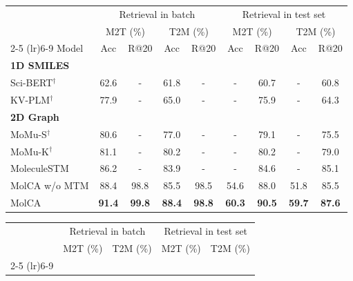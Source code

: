 \documentclass[11pt]{article}
\begin{document}
\begin{table*}[t!]
\begin{subtable}[t]{\textwidth}
   \centering
   \small
   \begin{tabular}{lcccccccc}\toprule
    & \multicolumn{4}{c}{Retrieval in batch} & \multicolumn{4}{c}{Retrieval in test set} \\
    & \multicolumn{2}{c}{M2T (\%)} & \multicolumn{2}{c}{T2M (\%)} & \multicolumn{2}{c}{M2T (\%)} & \multicolumn{2}{c}{T2M (\%)} \\\cmidrule(lr){2-5} \cmidrule(lr){6-9}
   Model & Acc & \multicolumn{1}{c}{R@20} & Acc & \multicolumn{1}{c}{R@20} & \multicolumn{1}{c}{Acc} & R@20 & \multicolumn{1}{c}{Acc} & R@20 \\\midrule
   \multicolumn{2}{l}{\textbf{1D SMILES}} & & \multicolumn{1}{l}{} & & & \multicolumn{1}{l}{} & & \multicolumn{1}{l}{} \\
   Sci-BERT$^\dag$ & 62.6 & - & 61.8 & - & - & 60.7 & - & 60.8 \\
   KV-PLM$^\dag$ & 77.9 & - & 65.0 & - & - & 75.9 & - & 64.3 \\\midrule
   \multicolumn{2}{l}{\textbf{2D Graph}} & & \multicolumn{1}{l}{} & & & \multicolumn{1}{l}{} & & \multicolumn{1}{l}{} \\
   MoMu-S$^\dag$ & 80.6 & - & 77.0 & - & - & 79.1 & - & 75.5 \\
   MoMu-K$^\dag$ & 81.1 & - & 80.2 & - & - & 80.2 & - & 79.0 \\
   MoleculeSTM & 86.2 & - & 83.9 & - & - & 84.6 & - & 85.1 \\
   MolCA w/o MTM & 88.4 & \multicolumn{1}{c}{98.8} & 85.5 & \multicolumn{1}{c}{98.5} & \multicolumn{1}{c}{54.6} & 88.0 & \multicolumn{1}{c}{51.8} & 85.5 \\
   MolCA & \textbf{91.4} & \multicolumn{1}{c}{\textbf{99.8}} & \textbf{88.4} & \multicolumn{1}{c}{\textbf{98.8}} & \multicolumn{1}{c}{\textbf{60.3}} & \textbf{90.5} & \multicolumn{1}{c}{\textbf{59.7}} & \textbf{87.6} \\\bottomrule
   \end{tabular}
   \caption{Molecule-text retrieval performances in the PCDes dataset.}
   \end{subtable}
   \begin{subtable}[t]{\textwidth}
   \small
   \centering
   \begin{tabular}{lcccccccc} \toprule
    & \multicolumn{4}{c}{Retrieval in batch} & \multicolumn{4}{c}{Retrieval in test set} \\
    & \multicolumn{2}{c}{M2T (\%)} & \multicolumn{2}{c}{T2M (\%)} & \multicolumn{2}{c}{M2T (\%)} & \multicolumn{2}{c}{T2M (\%)} \\\cmidrule(lr){2-5} \cmidrule(lr){6-9}

\end{tabular}
\end{subtable}
\end{table*}
\end{document}
